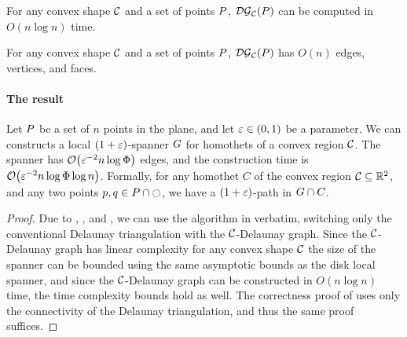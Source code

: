 \documentclass[12pt]{article}%
\begin{document}
\begin{theorem}
    For any convex shape $\mathcal{C}$ and a set of points $P$,
    $\mathcal{DG}_{\mathcal{C}}(P)$ can be computed in $O(n \log n)$ time.
\end{theorem}

\begin{lemma}
    For any convex shape $\mathcal{C}$ and a set of points $P$,
    $\mathcal{DG}_{\mathcal{C}}(P)$ has $O(n)$ edges, vertices, and faces.
\end{lemma}


\paragraph{The result}
\begin{theorem}
    Let $P$ be a set of $n$ points in the plane, and let
    $\varepsilon \in (0,1)$ be a parameter. We can constructs a local
    $(1+\varepsilon)$-spanner $G$ for homothets of a convex region
    $\mathcal{C}$. The spanner has $\Of\pth{ \eps^{-2} n\log \spread }$ edges,
    and the construction time is
    $\Of\pth{ \eps^{-2} n\log \spread \log n }$.  Formally, for any
    homothet $C$ of the convex region $\mathcal{C}\subseteq \mathbb{R}^2$, and any
    two points $p, q \in P \cap \ocircle$, we have a
    $(1+\varepsilon)$-path in $G \cap {C}$.
\end{theorem}

\begin{proof}
    Due to ,
    , and , we can use
    the algorithm in  verbatim, switching
    only the conventional Delaunay triangulation with the
    $\mathcal{C}$-Delaunay graph. Since the $\mathcal{C}$-Delaunay graph has linear
    complexity for any convex shape $\mathcal{C}$ the size of the spanner can
    be bounded using the same asymptotic bounds as the disk local
    spanner, and since the $\mathcal{C}$-Delaunay graph can be constructed in
    $O(n\log n)$ time, the time complexity bounds hold as well. The
    correctness proof of  uses only the connectivity of
    the Delaunay triangulation, and thus the same proof suffices.
	

\end{proof}



\end{document}
